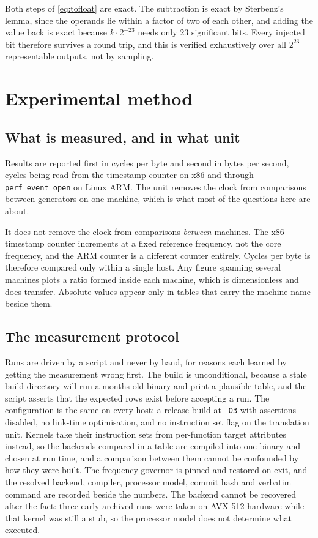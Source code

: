 \documentclass[acmsmall,screen,review]{acmart}
\theoremstyle{acmdefinition}
\newcommand{\code}[1]{\texttt{#1}}
\begin{document}
Both steps of \cref{eq:tofloat} are exact. The subtraction is exact by
Sterbenz's lemma, since the operands lie within a factor of two of each other,
and adding the value back is exact because $k \cdot 2^{-23}$ needs only 23
significant bits. Every injected bit therefore survives a round trip, and this
is verified exhaustively over all $2^{23}$ representable outputs, not by
sampling.


\section{Experimental method}\label{sec:method}

\subsection{What is measured, and in what unit}

Results are reported first in cycles per byte and second in bytes per second,
cycles being read from the timestamp counter on x86 and through
\code{perf\_event\_open} on Linux ARM. The unit removes the clock from
comparisons between generators on one machine, which is what most of the
questions here are about.

It does not remove the clock from comparisons \emph{between} machines. The x86
timestamp counter increments at a fixed reference frequency, not the
core frequency, and the ARM counter is a different counter entirely. Cycles per
byte is therefore compared only within a single host. Any figure spanning
several machines plots a ratio formed inside each machine, which is
dimensionless and does transfer. Absolute values appear only in tables that
carry the machine name beside them.

\subsection{The measurement protocol}

Runs are driven by a script and never by hand, for reasons each learned by
getting the measurement wrong first. The build is unconditional, because a
stale build directory will run a months-old binary and print a plausible table,
and the script asserts that the expected rows exist before accepting a run. The
configuration is the same on every host: a release build at \code{-O3} with
assertions disabled, no link-time optimisation, and no instruction set flag on
the translation unit. Kernels take their instruction sets from per-function
target attributes instead, so the backends compared in a table are compiled into
one binary and chosen at run time, and a comparison between them cannot be
confounded by how they were built. The frequency governor is pinned and restored
on exit, and the resolved backend, compiler, processor model, commit hash and
verbatim command are recorded beside the numbers. The backend cannot be
recovered after the fact: three early archived runs were taken on AVX-512
hardware while that kernel was still a stub, so the processor model does not
determine what executed.
\end{document}
